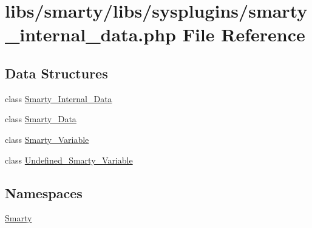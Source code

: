 \hypertarget{smarty__internal__data_8php}{}\section{libs/smarty/libs/sysplugins/smarty\+\_\+internal\+\_\+data.php File Reference}
\label{smarty__internal__data_8php}
\subsection*{Data Structures}
\begin{DoxyCompactItemize}
\item 
class \hyperlink{class_smarty___internal___data}{Smarty\+\_\+\+Internal\+\_\+\+Data}
\item 
class \hyperlink{class_smarty___data}{Smarty\+\_\+\+Data}
\item 
class \hyperlink{class_smarty___variable}{Smarty\+\_\+\+Variable}
\item 
class \hyperlink{class_undefined___smarty___variable}{Undefined\+\_\+\+Smarty\+\_\+\+Variable}
\end{DoxyCompactItemize}
\subsection*{Namespaces}
\begin{DoxyCompactItemize}
\item 
 \hyperlink{namespace_smarty}{Smarty}
\end{DoxyCompactItemize}
